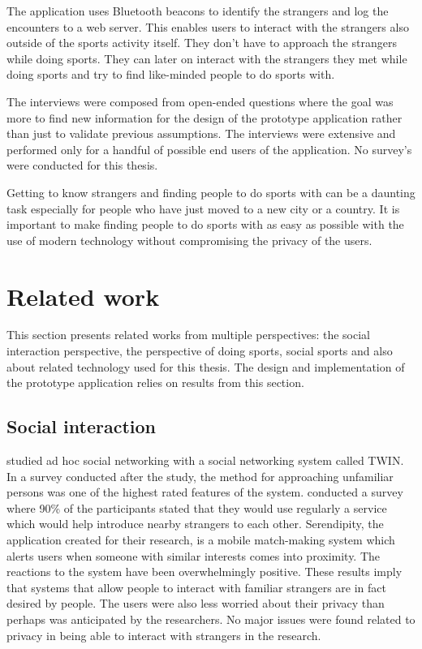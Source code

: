 The application uses Bluetooth beacons to identify the strangers and log the encounters to a web server. This enables users to interact with the strangers also outside of the sports activity itself. They don't have to approach the strangers while doing sports. They can later on interact with the strangers they met while doing sports and try to find like-minded people to do sports with. 

The interviews were composed from open-ended questions where the goal was more to find new information for the design of the prototype application rather than just to validate previous assumptions. The interviews were extensive and performed only for a handful of possible end users of the application. No survey's were conducted for this thesis.

Getting to know strangers and finding people to do sports with can be a daunting task especially for people who have just moved to a new city or a country. It is important to make finding people to do sports with as easy as possible with the use of modern technology without compromising the privacy of the users.
\clearpage

\section{Related work}

This section presents related works from multiple perspectives: the social interaction perspective, the perspective of doing sports, social sports and also about related technology used for this thesis. The design and implementation of the prototype application relies on results from this section.

\subsection{Social interaction}

\cite{socialAdHoc} studied ad hoc social networking with a social networking system called TWIN. In a survey conducted after the study, the method for approaching unfamiliar persons was one of the highest rated features of the system. \cite{mobileMatchmaking} conducted a survey where 90\% of the participants stated that they would use regularly a service which would help introduce nearby strangers to each other. Serendipity, the application created for their research, is a mobile match-making system which alerts users when someone with similar interests comes into proximity. The reactions to the system have been overwhelmingly positive. These results imply that systems that allow people to interact with familiar strangers are in fact desired by people. The users were also less worried about their privacy than perhaps was anticipated by the researchers. No major issues were found related to privacy in being able to interact with strangers in the research.

